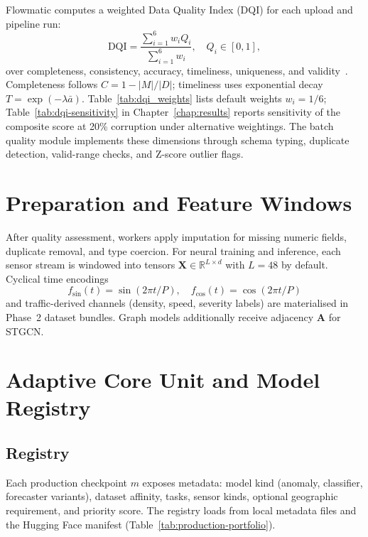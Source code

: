 Flowmatic computes a weighted Data Quality Index (DQI) for each upload and pipeline run:
\begin{equation}
\label{eq:dqi}
\mathrm{DQI} = \frac{\sum_{i=1}^{6} w_i Q_i}{\sum_{i=1}^{6} w_i}, \quad Q_i \in [0,1],
\end{equation}
over completeness, consistency, accuracy, timeliness, uniqueness, and validity~\cite{wang1996beyond,pipino2002data,heinrich2007assessing}. Completeness follows $C = 1 - |M|/|D|$; timeliness uses exponential decay $T = \exp(-\lambda \bar{a})$. Table~\ref{tab:dqi_weights} lists default weights $w_i = 1/6$; Table~\ref{tab:dqi-sensitivity} in Chapter~\ref{chap:results} reports sensitivity of the composite score at 20\% corruption under alternative weightings. The batch quality module implements these dimensions through schema typing, duplicate detection, valid-range checks, and Z-score outlier flags.



\section{Preparation and Feature Windows}

After quality assessment, workers apply imputation for missing numeric fields, duplicate removal, and type coercion. For neural training and inference, each sensor stream is windowed into tensors $\mathbf{X} \in \mathbb{R}^{L \times d}$ with $L=48$ by default. Cyclical time encodings
\begin{equation}
f_{\sin}(t) = \sin(2\pi t/P), \quad f_{\cos}(t) = \cos(2\pi t/P)
\end{equation}
and traffic-derived channels (density, speed, severity labels) are materialised in Phase~2 dataset bundles. Graph models additionally receive adjacency $\mathbf{A}$ for STGCN.

\section{Adaptive Core Unit and Model Registry}

\subsection{Registry}

Each production checkpoint $m$ exposes metadata: model kind (anomaly, classifier, forecaster variants), dataset affinity, tasks, sensor kinds, optional geographic requirement, and priority score. The registry loads from local metadata files and the Hugging Face manifest (Table~\ref{tab:production-portfolio}).

